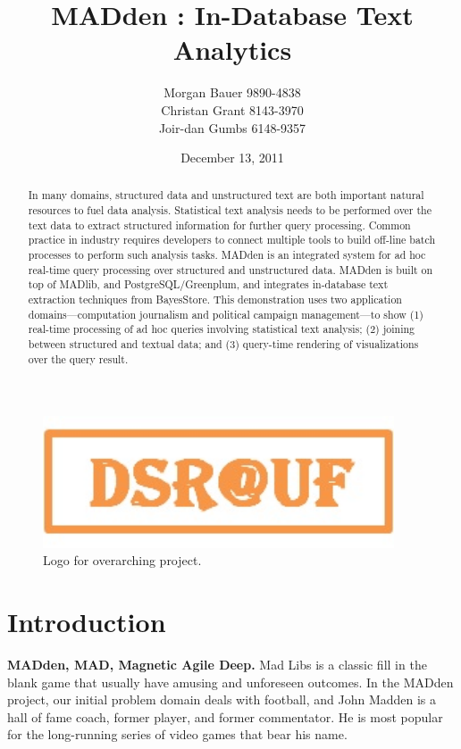 \documentclass[11pt]{article}
\title{MADden : In-Database Text Analytics}
\author{Morgan Bauer 9890-4838 \\
  Christan Grant 8143-3970 \\
  Joir-dan Gumbs 6148-9357}
\date{December 13, 2011}
\newcommand{\system}{MADden\xspace}
\begin{document}
\maketitle

\begin{figure}
  \begin{center}
    \includegraphics[width=104mm]{logo.jpg}
    \caption{Logo for overarching project.}
    \label{fig:logo}
  \end{center}
\end{figure}


\begin{abstract}
In many domains, structured data and unstructured text are
both important natural resources to fuel data analysis. Statistical
text analysis needs to be performed over the text data to extract
structured information for further query processing. Common practice
in industry requires developers to connect multiple tools to build
off-line batch processes to perform such analysis tasks. \system is
an integrated system for ad hoc real-time query processing over
structured and unstructured data. \system is built on top of MADlib,
and PostgreSQL/Greenplum, and integrates in-database text extraction
techniques from BayesStore. This demonstration uses two application
domains---computation journalism and political campaign
management---to show (1) real-time processing of ad hoc queries
involving statistical text analysis; (2) joining between structured
and textual data; and (3) query-time rendering of
visualizations over the query result.
\end{abstract}




  \section{Introduction}

  \textbf{\system, MAD, Magnetic Agile Deep.}
  Mad Libs is a classic fill in the blank game that usually have amusing and unforeseen outcomes.
  In the \system project, our initial problem domain deals with football,
  and John Madden is a hall of fame coach, former player, and former commentator.
	He is most popular
  for the long-running series of video games that bear his name.
\end{document}
